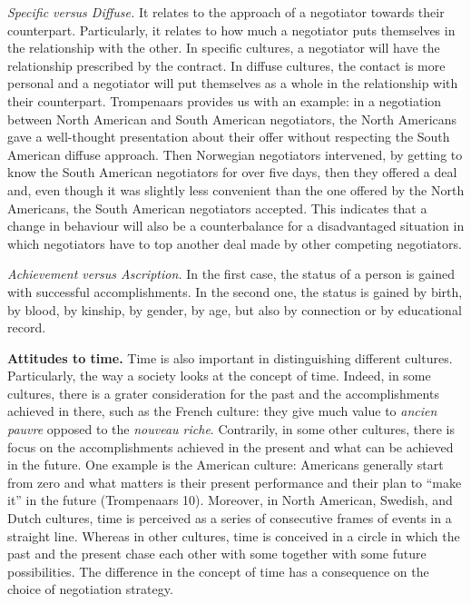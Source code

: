 \documentclass[../main.tex]{subfiles}
\begin{document}
\textit{Specific versus Diffuse.} It relates to the approach of a negotiator towards their counterpart. Particularly, it relates to how much a negotiator puts themselves in the relationship with the other. In specific cultures, a negotiator will have the relationship prescribed by the contract. In diffuse cultures, the contact is more personal and a negotiator will put themselves as a whole in the relationship with their counterpart. Trompenaars provides us with an example: in a negotiation between North American and South American negotiators, the North Americans gave a well-thought presentation about their offer without respecting the South American diffuse approach. Then Norwegian negotiators intervened, by getting to know the South American negotiators for over five days, then they offered a deal and, even though it was slightly less convenient than the one offered by the North Americans, the South American negotiators accepted. This indicates that a change in behaviour will also be a counterbalance for a disadvantaged situation in which negotiators have to top another deal made by other competing negotiators.

\textit{Achievement versus Ascription.} In the first case, the status of a person is gained with successful accomplishments. In the second one, the status is gained by birth, by blood, by kinship, by gender, by age, but also by connection or by educational record.

\textbf{Attitudes to time.} Time is also important in distinguishing different cultures. Particularly, the way a society looks at the concept of time. Indeed, in some cultures, there is a grater consideration for the past and the accomplishments achieved in there, such as the French culture: they give much value to \textit{ancien pauvre} opposed to the \textit{nouveau riche}. Contrarily, in some other cultures, there is focus on the accomplishments achieved in the present and what can be achieved in the future. One example is the American culture: Americans generally start from zero and what matters is their present performance and their plan to “make it” in the future (Trompenaars 10). Moreover, in North American, Swedish, and Dutch cultures, time is perceived as a series of consecutive frames of events in a straight line. Whereas in other cultures, time is conceived in a circle in which the past and the present chase each other with some together with some future possibilities. The difference in the concept of time has a consequence on the choice of negotiation strategy. 
\end{document}
